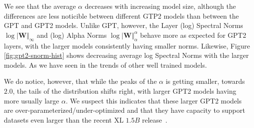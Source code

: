 We see that the average $\alpha$ decreases with increasing model size, although the differences are less noticible between different GTP2 models than between the GPT and GPT2 models.
Unlike GPT, however, the Layer (log) Spectral Norms $\log\vert\mathbf{W}\Vert_{\infty}$ 
and (log) Alpha Norms $\log\vert\mathbf{W}\Vert_{\alpha}^{\alpha}$
behave more as expected for GPT2 layers, with the larger models  consistently having  smaller norms. 
Likewise, Figure \ref{fig:gpt2-snorm-hist} shows decreasing average log Spectral Norms with the larger models.  
As we have seen in the trends of other well trained models.

We do notice, however, that while the peaks of the $\alpha$ is getting smaller, 
towards $2.0$,
the tails of the distribution shifts right, with larger GPT2 models having more
usually large $\alpha$.  
We suspect this indicates that these larger GPT2 models are over-parameterized/under-optimized and 
that they have capacity to support datasets even larger than the recent XL $1.5B$ release~\cite{gpt2-xl}.

